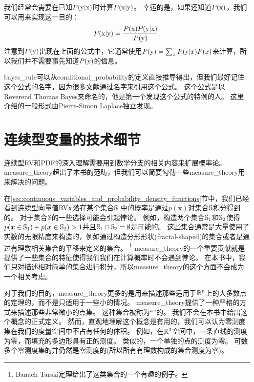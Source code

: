 \section{}
\label{sec:bayes_rule}

我们经常会需要在已知$P(\mathrm{y} | \mathrm{x})$时计算$P(\mathrm{x} | \mathrm{y})$。
幸运的是，如果还知道$P(\mathrm{x})$，我们可以用来实现这一目的：
\begin{equation}
P(\mathrm{x} | \mathrm{y}) = \frac{P(\mathrm{x}) P(\mathrm{y} | \mathrm{x})}{P(\mathrm{y})}.
\end{equation}
注意到$P(\mathrm{y})$出现在上面的公式中，它通常使用$P(\mathrm{y}) = \sum_x P(\mathrm{y} | x) P(x)$来计算，所以我们并不需要事先知道$P(\mathrm{y})$的信息。

\gls{bayes_rule}可以从\gls{conditional_probability}的定义直接推导得出，但我们最好记住这个公式的名字，因为很多文献通过名字来引用这个公式。
这个公式是以Reverend Thomas Bayes来命名的，他是第一个发现这个公式的特例的人。
这里介绍的一般形式由Pierre-Simon Laplace独立发现。

\section{连续型变量的技术细节}
\label{sec:technical_details_of_continuous_variables}

连续型\gls{RV}和\gls{PDF}的深入理解需要用到数学分支的相关内容来扩展概率论。
\gls{measure_theory}超出了本书的范畴，但我们可以简要勾勒一些\gls{measure_theory}用来解决的问题。

在\ref{sec:continuous_variables_and_probability_density_functions}节中，我们已经看到连续型向量值\gls{RV}$\mathbf{x}$落在某个集合$\mathbb{S}$ 中的概率是通过$p(\bm{x})$对集合$\mathbb{S}$积分得到的。
对于集合$\mathbb{S}$的一些选择可能会引起悖论。
例如，构造两个集合$\mathbb{S}_1$和$\mathbb{S}_2$使得$p(\bm{x}\in \mathbb{S}_1) + p(\bm{x}\in \mathbb{S}_2)>1$并且$\mathbb{S}_1 \cap \mathbb{S}_2 = \emptyset$是可能的。
这些集合通常是大量使用了实数的无限精度来构造的，例如通过构造分形形状(fractal-shaped)的集合或者是通过有理数相关集合的平移来定义的集合。
\footnote{Banach-Tarski定理给出了这类集合的一个有趣的例子。}
\gls{measure_theory}的一个重要贡献就是提供了一些集合的特征使得我们我们在计算概率时不会遇到悖论。
在本书中，我们只对描述相对简单的集合进行积分，所以\gls{measure_theory}的这个方面不会成为一个相关考虑。


对于我们的目的，\gls{measure_theory}更多的是用来描述那些适用于$\mathbb{R}^n$上的大多数点的定理的，而不是只适用于一些小的情况。
\gls{measure_theory}提供了一种严格的方式来描述那些非常微小的点集。
这种集合被称为``''的。
我们不会在本书中给出这个概念的正式定义。
然而，直观地理解这个概念是有用的，我们可以认为零测度集在我们的度量空间中不占有任何的体积。
例如，在$\mathbb{R}^2$空间中，一条直线的测度为零，而填充的多边形具有正的测度。
类似的，一个单独的点的测度为零。
可数多个零测度集的并仍然是零测度的(所以所有有理数构成的集合测度为零)。

